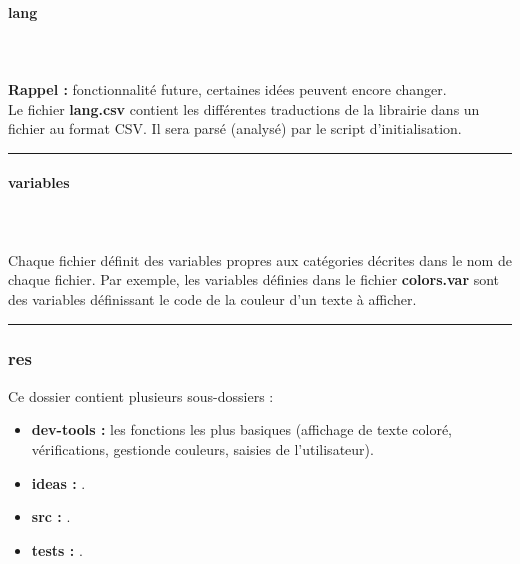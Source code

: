 \documentclass[a4paper,10pt]{article}
\begin{document}
\paragraph{lang}\mbox{}\\\mbox{}\\
\textbf{Rappel :} fonctionnalité future, certaines idées peuvent encore changer.\\[1\baselineskip]

Le fichier \textbf{\color{lime}lang.csv\color{white}} contient les différentes traductions de la librairie dans un fichier au format CSV. Il sera parsé (analysé) par le script d'initialisation.\\[1\baselineskip]



\par\noindent\rule{\textwidth}{0.4pt}

\paragraph{variables}\mbox{}\\\mbox{}\\
Chaque fichier définit des variables propres aux catégories décrites dans le nom de chaque fichier. Par exemple, les variables définies dans le fichier \textbf{\color{lime}colors.var\color{white}} sont des variables définissant le code de la couleur d'un texte à afficher.\\[1\baselineskip]



\color{blue}\par\noindent\rule{\textwidth}{0.4pt}\color{white}

\color{blue}
\subsubsection{res}\color{white}
Ce dossier contient plusieurs sous-dossiers :
\begin{itemize}
    \item \textbf{\color{lime}dev-tools\color{white} :} les fonctions les plus basiques (affichage de texte coloré, vérifications, gestion\linebreak de couleurs, saisies de l'utilisateur).\\[1\baselineskip]

    \item \textbf{\color{lime}ideas\color{white} :} .\\[1\baselineskip]

    \item \textbf{\color{lime}src\color{white} :} .\\[1\baselineskip]

    \item \textbf{\color{lime}tests\color{white} :} .\\[1\baselineskip]
\end{itemize}
\end{document}

